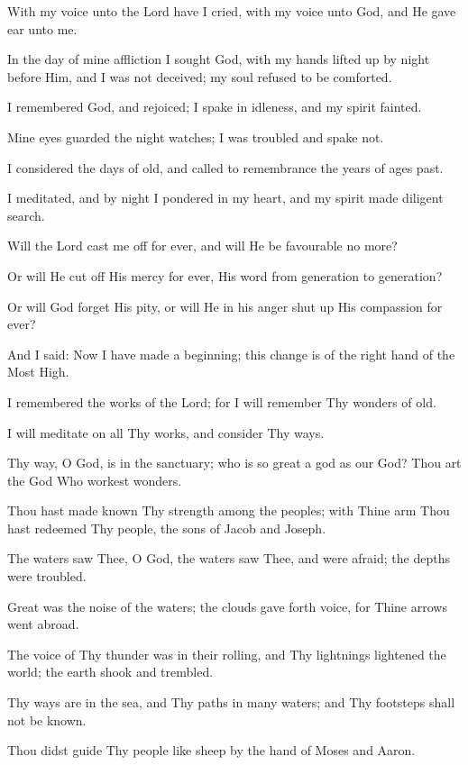 With my voice unto the Lord have I cried, with my voice unto God, and He gave ear unto me.

In the day of mine affliction I sought God, with my hands lifted up by night before Him, and I was not deceived; my soul refused to be comforted.

I remembered God, and rejoiced; I spake in idleness, and my spirit fainted.

Mine eyes guarded the night watches; I was troubled and spake not.

I considered the days of old, and called to remembrance the years of ages past.

I meditated, and by night I pondered in my heart, and my spirit made diligent search.

Will the Lord cast me off for ever, and will He be favourable no more?

Or will He cut off His mercy for ever, His word from generation to generation?

Or will God forget His pity, or will He in his anger shut up His compassion for ever?

And I said: Now I have made a beginning; this change is of the right hand of the Most High.

I remembered the works of the Lord; for I will remember Thy wonders of old.

I will meditate on all Thy works, and consider Thy ways.

Thy way, O God, is in the sanctuary; who is so great a god as our God? Thou art the God Who workest wonders.

Thou hast made known Thy strength among the peoples; with Thine arm Thou hast redeemed Thy people, the sons of Jacob and Joseph.

The waters saw Thee, O God, the waters saw Thee, and were afraid; the depths were troubled.

Great was the noise of the waters; the clouds gave forth voice, for Thine arrows went abroad.

The voice of Thy thunder was in their rolling, and Thy lightnings lightened the world; the earth shook and trembled.

Thy ways are in the sea, and Thy paths in many waters; and Thy footsteps shall not be known.

Thou didst guide Thy people like sheep by the hand of Moses and Aaron.
